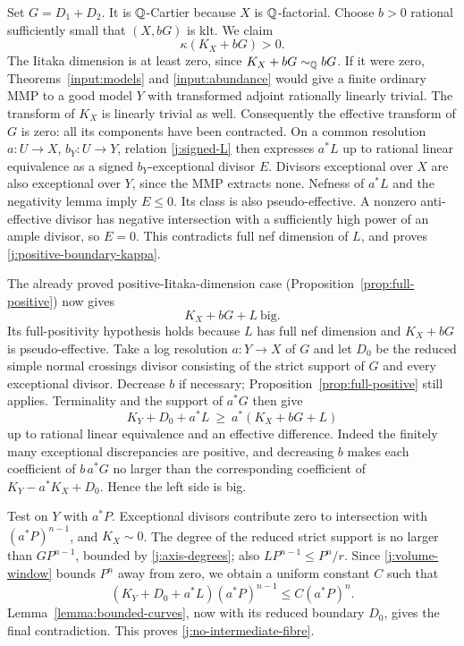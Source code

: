 Set $G=D_1+D_2$. It is $\mathbb Q$-Cartier because $X$ is
$\mathbb Q$-factorial. Choose $b>0$ rational sufficiently small that
$(X,bG)$ is klt. We claim
\begin{equation}\label{j:positive-boundary-kappa}
                         \kappa(K_X+bG)>0.
\end{equation}
The Iitaka dimension is at least zero, since
$K_X+bG\sim_\mathbb Q bG$. If it were zero, Theorems~\ref{input:models}
and \ref{input:abundance} would give a finite ordinary MMP to a
good model $Y$ with transformed adjoint rationally linearly
trivial. The transform of $K_X$ is linearly trivial as well.
Consequently the effective transform of $G$ is zero: all its
components have been contracted. On a common resolution
$a:U\to X$, $b_Y:U\to Y$, relation \eqref{j:signed-L} then
expresses $a^*L$ up to rational linear equivalence as a signed
$b_Y$-exceptional divisor $E$. Divisors exceptional over $X$ are
also exceptional over $Y$, since the MMP extracts none.
Nefness of $a^*L$ and the negativity lemma imply $E\le0$.
Its class is also pseudo-effective. A nonzero anti-effective
divisor has negative intersection with a sufficiently high power
of an ample divisor, so $E=0$. This contradicts full nef dimension
of $L$, and proves \eqref{j:positive-boundary-kappa}.

The already proved positive-Iitaka-dimension case
(Proposition~\ref{prop:full-positive}) now gives
\[
                         K_X+bG+L\ \text{big}.
\]
Its full-positivity hypothesis holds because $L$ has full nef
dimension and $K_X+bG$ is pseudo-effective.
Take a log resolution $a:Y\to X$ of $G$ and let $D_0$ be the
reduced simple normal crossings divisor consisting of the strict
support of $G$ and every exceptional divisor. Decrease $b$ if
necessary; Proposition~\ref{prop:full-positive} still applies.
Terminality and the support of $a^*G$ then give
\[
 K_Y+D_0+a^*L\ \ge\ a^*(K_X+bG+L)
\]
up to rational linear equivalence and an effective difference.
Indeed the finitely many exceptional discrepancies are positive,
and decreasing $b$ makes each coefficient of $b\,a^*G$ no larger
than the corresponding coefficient of $K_Y-a^*K_X+D_0$.
Hence the left side is big.

Test on $Y$ with $a^*P$. Exceptional divisors contribute zero to
intersection with $(a^*P)^{n-1}$, and $K_X\sim0$. The degree of
the reduced strict support is no larger than $GP^{n-1}$, bounded
by \eqref{j:axis-degrees}; also
$LP^{n-1}\le P^n/r$. Since \eqref{j:volume-window} bounds $P^n$
away from zero, we obtain a uniform constant $C$ such that
\[
 (K_Y+D_0+a^*L)(a^*P)^{n-1}\le C(a^*P)^n.
\]
Lemma~\ref{lemma:bounded-curves}, now with its reduced boundary
$D_0$, gives the final contradiction. This proves
\eqref{j:no-intermediate-fibre}.

